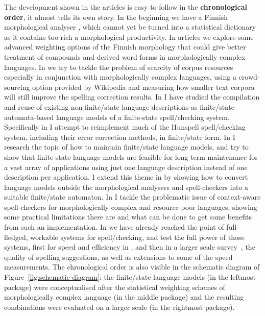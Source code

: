 \documentclass[officiallayout]{unihelcompling}
\begin{document}
The development shown in the articles is easy to follow in the
\textbf{chronological order}, it almost tells its own story. In the beginning
we have a Finnish morphological analyser \citep{pirinen2008suomen}, which
cannot yet be turned into a statistical dictionary as it contains too rich a
morphological productivity. In articles
 we explore some advanced
weighting options of the Finnish morphology that could give better treatment of
compounds and derived word forms in morphologically complex languages. In
 we try to tackle the problem of scarcity of
corpus resources especially in conjunction with morphologically complex
languages, using a crowd-sourcing option provided by Wikipedia and measuring
how smaller text corpora will still improve the spelling correction results. In
 I have studied the
compilation and reuse of existing non-finite\-/state language descriptions as
finite\-/state automata-based language models of a finite-state
spell\-/checking system.  Specifically in  I
attempt to reimplement much of the Hunspell spell\-/checking system, including
their error correction methods, in finite\-/state form. In
 I research the topic of how to maintain
finite\-/state \glspl{language model}, and try to show that finite-state
language models are feasible for long-term maintenance for a vast array of
applications using just one language description instead of one description per
application.  I extend this theme in  by
showing how to convert language models outside the morphological analysers and
spell-checkers into a suitable finite\-/state automaton. In
 I tackle the problematic issue of
context-aware spell-checkers for morphologically complex and resource-poor
languages, showing some practical limitations there are and what can be done to
get some benefits from such an implementation. In
 we have already reached the
point of full-fledged, workable systems for spell\-/checking, and test the full
power of those systems, first for speed and efficiency in
, and then in a larger scale
survey~, the quality of spelling suggestions, as
well as extensions to some of the speed measurements.  The chronological order
is also visible in the schematic diagram of Figure~\ref{fig:schematic-diagram}:
the finite\-/state language models (in the leftmost package) were
conceptualised after the statistical weighting schemes of morphologically
complex language (in the middle package) and the resulting combinations were
evaluated on a larger scale (in the rightmost package).
\end{document}
